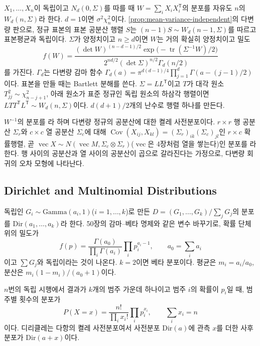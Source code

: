 $X_1,\dots,X_n$이 독립이고 $N_d(0,\Sigma)$를 따를 때 $W=\sum_iX_iX_i^{\mathsf T}$의 분포를 자유도 $n$의  $W_d(n,\Sigma)$라 한다\cite{wishart1928}. $d=1$이면 $\sigma^2\chi^2_n$이다. \cref{prop:mean-variance-independent}의 다변량 판으로, 정규 표본의 표본 공분산 행렬 $S$는 $(n-1)S\sim W_d(n-1,\Sigma)$를 따르고 표본평균과 독립이다. $\Sigma$가 양정치이고 $n\ge d$이면 $W$는 거의 확실히 양정치이고 밀도
\[
f(W)=\frac{(\det W)^{(n-d-1)/2}\exp\bigl(-\operatorname{tr}(\Sigma^{-1}W)/2\bigr)}{2^{nd/2}(\det\Sigma)^{n/2}\Gamma_d(n/2)}
\]
를 가진다. $\Gamma_d$는 다변량 감마 함수 $\Gamma_d(a)=\pi^{d(d-1)/4}\prod_{j=1}^d\Gamma(a-(j-1)/2)$이다. 표본을 만들 때는 Bartlett 분해를 쓴다. $\Sigma=LL^{\mathsf T}$이고 $T$가 대각 원소 $T_{jj}^2\sim\chi^2_{n-j+1}$, 아래 원소가 표준 정규인 독립 원소의 하삼각 행렬이면 $LTT^{\mathsf T}L^{\mathsf T}\sim W_d(n,\Sigma)$이다. $d(d+1)/2$개의 난수로 행렬 하나를 만든다.

$W^{-1}$의 분포를 라 하며 다변량 정규의 공분산에 대한 켤레 사전분포이다. $r\times r$ 행 공분산 $\Sigma_r$와 $c\times c$ 열 공분산 $\Sigma_c$에 대해 $\operatorname{Cov}(X_{ij},X_{kl})=(\Sigma_r)_{ik}(\Sigma_c)_{jl}$인 $r\times c$ 확률행렬, 곧 $\operatorname{vec}X\sim N(\operatorname{vec}M,\Sigma_c\otimes\Sigma_r)$($\operatorname{vec}$은 4장처럼 열을 쌓는다)인 분포를 라 한다. 행 사이의 공분산과 열 사이의 공분산이 곱으로 갈라진다는 가정으로, 다변량 회귀의 오차 모형에 나타난다.

\subsection{Dirichlet and Multinomial Distributions}

독립인 $G_i\sim\mathrm{Gamma}(a_i,1)$($i=1,\dots,k$)로 만든 $D=(G_1,\dots,G_k)/\sum_jG_j$의 분포를  $\mathrm{Dir}(a_1,\dots,a_k)$라 한다. 50장의 감마--베타 명제와 같은 변수 바꾸기로, 확률 단체 위의 밀도가
\[
f(p)=\frac{\Gamma(a_0)}{\prod_i\Gamma(a_i)}\prod_ip_i^{a_i-1},\qquad a_0=\sum_ia_i
\]
이고 $\sum G_j$와 독립이라는 것이 나온다. $k=2$이면 베타 분포이다. 평균은 $m_i=a_i/a_0$, 분산은 $m_i(1-m_i)/(a_0+1)$이다.

$n$번의 독립 시행에서 결과가 $k$개의 범주 가운데 하나이고 범주 $i$의 확률이 $p_i$일 때, 범주별 횟수의 분포가 
\[
P(X=x)=\frac{n!}{\prod_ix_i!}\prod_ip_i^{x_i},\qquad\sum_ix_i=n
\]
이다. 디리클레는 다항의 켤레 사전분포여서 사전분포 $\mathrm{Dir}(a)$에 관측 $x$를 더한 사후분포가 $\mathrm{Dir}(a+x)$이다.

